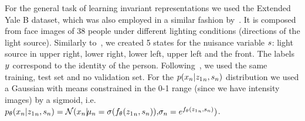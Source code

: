 For the general task of learning invariant representations we used the Extended Yale B dataset, which was also employed in a similar fashion by~\citet{li2014learning}. It is composed from face images of 38 people under different lighting conditions (directions of the light source). Similarly to~\citet{li2014learning}, we created 5 states for the nuisance variable $\*s$: light source in upper right, lower right, lower left, upper left and the front. The labels $\*y$ correspond to the identity of the person. Following~\citet{li2014learning}, we used the same training, test set and no validation set. For the $p(\*x_n|{\*z_1}_n, \*s_n)$ distribution we used a Gaussian with means constrained in the 0-1 range (since we have intensity images) by a sigmoid, i.e. $p_\theta(\*x_n|{\*z_1}_n, \*s_n) = \mathcal{N}(\*x_n| \!\mu_n = \sigma(f_\theta({\*z_1}_n, \*s_n)), \!\sigma_n = e^{f_\theta({\*z_1}_n, \*s_n)})$.
